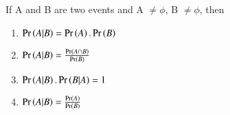 \documentclass[journal,12pt,twocolumn]{IEEEtran}
\theoremstyle{remark}
\begin{document}



\maketitle

\newpage


\bigskip

\renewcommand{\thefigure}{\theenumi}
\renewcommand{\thetable}{\theenumi}

%




%
If A and B are two events and A $\ne \phi$, B $\ne \phi$, then
\begin{enumerate}
	\item $\Pr\left(A|B\right) = \Pr\left(A\right).\Pr\left(B\right)$
	\item $\Pr\left(A|B\right) = \frac{\Pr\left(A\cap B\right)}{\Pr\left(B\right)}$
	\item $\Pr\left(A|B\right).\Pr\left(B|A\right) = 1$
	\item $\Pr\left(A|B\right) = \frac{\Pr\left(A\right)}{\Pr\left(B\right)}$
\end{enumerate}
\solution 
\end{document}
